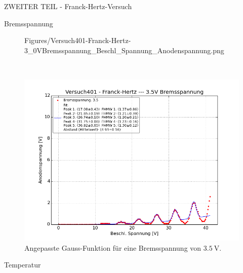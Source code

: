 \begin{appendix}
\begin{chapter}{ZWEITER TEIL - Franck-Hertz-Versuch}
\begin{section}{Bremsspannung}
\begin{figure}[ht!]
\begin{minipage}{0.48\textwidth}
              {Figures/Versuch401-Franck-Hertz-3_0VBremsspannung_Beschl_Spannung_Anodenspannung.png}
          \caption{Angepasste Gauss-Funktion für eine Bremsspannung von 
              $\SI{3.0}{\volt}$.}
          \label{fig:AnhangFHB30V}
        \end{minipage} \\
        \begin{minipage}{0.48\textwidth}
          \centering
          \includegraphics[width=\textwidth]
              {Figures/Versuch401-Franck-Hertz-3_5VBremsspannung_Beschl_Spannung_Anodenspannung.png}
          \caption{Angepasste Gauss-Funktion für eine Bremsspannung von 
              $\SI{3.5}{\volt}$.}
          \label{fig:AnhangFHB35V}
        \end{minipage}
      \end{figure}
      
    \end{section}
    
    
    
    \newpage
    \begin{section}{Temperatur}
      \label{Anhang:chp:ZWEITERTEILtemperatur}
      

\end{section}
\end{chapter}
\end{appendix}
